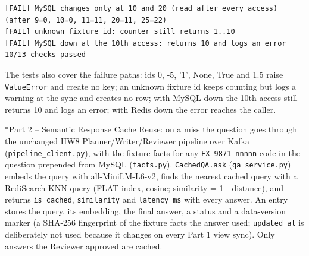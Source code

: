 \documentclass[11pt]{article}
\makeatletter
\renewcommand\section{\@startsection{section}{1}{\z@}{-3.0ex \@plus -1ex \@minus -.2ex}{1.2ex \@plus.2ex}{\normalfont\fontsize{14}{17}\selectfont\bfseries}}
\makeatother
\begin{document}
\begingroup\lstset{basicstyle=\ttfamily\tiny}
\begin{lstlisting}
[FAIL] MySQL changes only at 10 and 20 (read after every access)  (after 9=0, 10=0, 11=11, 20=11, 25=22)
[FAIL] unknown fixture id: counter still returns 1..10
[FAIL] MySQL down at the 10th access: returns 10 and logs an error
10/13 checks passed
\end{lstlisting}
\endgroup
The tests also cover the failure paths: ids 0, -5, '1', None, True and 1.5 raise \texttt{ValueError} and create no key; an unknown fixture id keeps counting but logs a warning at the sync and creates no row; with MySQL down the 10th access still returns 10 and logs an error; with Redis down the error reaches the caller.

\section*{Part 2 -- Semantic Response Cache}
Reuse: on a miss the question goes through the unchanged HW8 Planner/Writer/Reviewer pipeline over Kafka (\texttt{pipeline\_\allowbreak{}client.py}), with the fixture facts for any \texttt{FX-9871-nnnnn} code in the question prepended from MySQL (\texttt{facts.py}). \texttt{CachedQA.ask} (\texttt{qa\_\allowbreak{}service.py}) embeds the query with all-MiniLM-L6-v2, finds the nearest cached query with a RediSearch KNN query (FLAT index, cosine; similarity = 1 - distance), and returns \texttt{is\_\allowbreak{}cached}, \texttt{similarity} and \texttt{latency\_\allowbreak{}ms} with every answer. An entry stores the query, its embedding, the final answer, a status and a data-version marker (a SHA-256 fingerprint of the fixture facts the answer used; \texttt{updated\_\allowbreak{}at} is deliberately not used because it changes on every Part 1 view sync). Only answers the Reviewer approved are cached.
\end{document}
